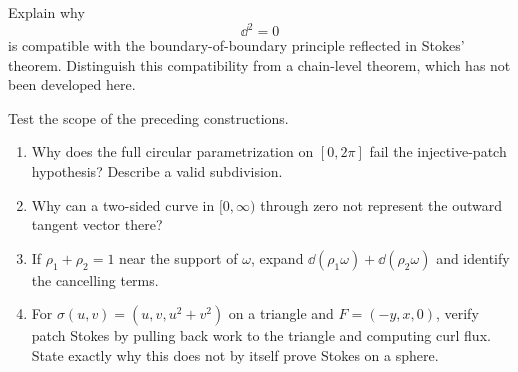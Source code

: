 \begin{exercise}
Explain why
\[
\dd^2=0
\]
is compatible with the boundary-of-boundary principle reflected in Stokes'
theorem. Distinguish this compatibility from a chain-level theorem, which
has not been developed here.
\end{exercise}

\begin{exercise}
Test the scope of the preceding constructions.
\begin{enumerate}
\item Why does the full circular parametrization on $[0,2\pi]$ fail the
injective-patch hypothesis? Describe a valid subdivision.
\item Why can a two-sided curve in $[0,\infty)$ through zero not represent
the outward tangent vector there?
\item If $\rho_1+\rho_2=1$ near the support of $\omega$, expand
$\dd(\rho_1\omega)+\dd(\rho_2\omega)$ and identify the cancelling terms.
\item For $\sigma(u,v)=(u,v,u^2+v^2)$ on a triangle and $F=(-y,x,0)$,
verify patch Stokes by pulling back work to the triangle and computing curl
flux. State exactly why this does not by itself prove Stokes on a sphere.
\end{enumerate}
\end{exercise}

